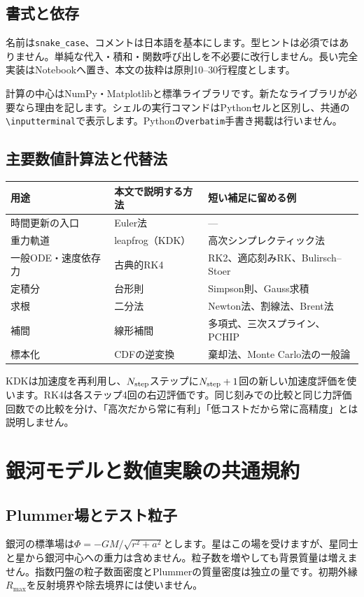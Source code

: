 \documentclass[10pt,openany]{book}
\begin{document}
\subsection{書式と依存}
名前は\texttt{snake\_case}、コメントは日本語を基本にします。型ヒントは必須ではありません。単純な代入・積和・関数呼び出しを不必要に改行しません。長い完全実装はNotebookへ置き、本文の抜粋は原則10--30行程度とします。

計算の中心はNumPy・Matplotlibと標準ライブラリです。新たなライブラリが必要なら理由を記します。シェルの実行コマンドはPythonセルと区別し、共通の\verb|\inputterminal|で表示します。Pythonの\texttt{verbatim}手書き掲載は行いません。


\subsection{主要数値計算法と代替法}
\begin{center}\small
\begin{tabularx}{\linewidth}{lXX}\toprule
用途 & 本文で説明する方法 & 短い補足に留める例\\\midrule
時間更新の入口 & Euler法 & ---\\
重力軌道 & leapfrog（KDK） & 高次シンプレクティック法\\
一般ODE・速度依存力 & 古典的RK4 & RK2、適応刻みRK、Bulirsch--Stoer\\
定積分 & 台形則 & Simpson則、Gauss求積\\
求根 & 二分法 & Newton法、割線法、Brent法\\
補間 & 線形補間 & 多項式、三次スプライン、PCHIP\\
標本化 & CDFの逆変換 & 棄却法、Monte Carlo法の一般論\\\bottomrule
\end{tabularx}\end{center}
KDKは加速度を再利用し、$N_{\rm step}$ステップに$N_{\rm step}+1$回の新しい加速度評価を使います。RK4は各ステップ4回の右辺評価です。同じ刻みでの比較と同じ力評価回数での比較を分け、「高次だから常に有利」「低コストだから常に高精度」とは説明しません。

\section{銀河モデルと数値実験の共通規約}
\subsection{Plummer場とテスト粒子}
銀河の標準場は$\Phi=-GM/\sqrt{r^2+a^2}$とします。星はこの場を受けますが、星同士と星から銀河中心への重力は含めません。粒子数を増やしても背景質量は増えません。指数円盤の粒子数面密度とPlummerの質量密度は独立の量です。初期外縁$R_{\max}$を反射境界や除去境界には使いません。
\end{document}
